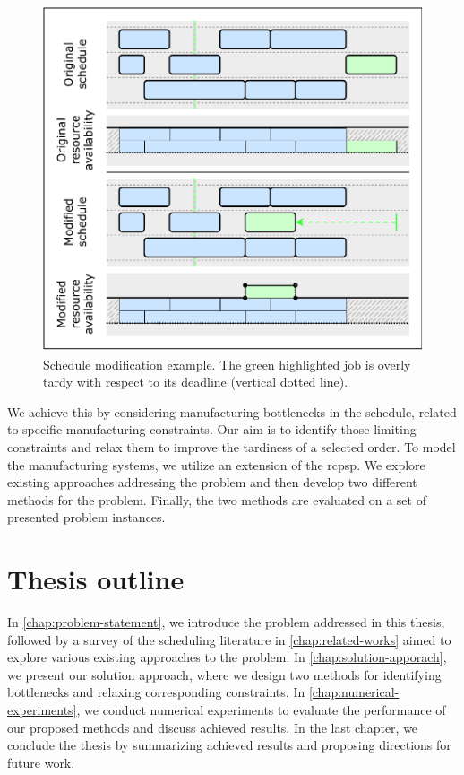 \begin{figure}[b]
    \centering
    \includegraphics[width=\textwidth]{img/Schedule-Change.pdf}
    \caption{
        Schedule modification example.
        The green highlighted job is overly tardy with respect to its deadline (vertical dotted line).
        }
    \label{fig:schedule-change}
\end{figure}

We achieve this by considering manufacturing bottlenecks in the schedule,
related to specific manufacturing constraints.
Our aim is to identify those limiting constraints
and relax them to improve the tardiness of a selected order.
To model the manufacturing systems, we utilize an extension of the \acf{rcpsp}.
We explore existing approaches addressing the problem
and then develop two different methods for the problem.
Finally, the two methods are evaluated on a set of presented problem instances.

\section*{Thesis outline} \label{sec:introduction/thesis-outline}

In \cref{chap:problem-statement}, we introduce the problem addressed in this thesis,
followed by a survey of the scheduling literature in \cref{chap:related-works}
aimed to explore various existing approaches to the problem.
In \cref{chap:solution-apporach}, we present our solution approach,
where we design two methods for identifying bottlenecks and relaxing corresponding constraints.
In \cref{chap:numerical-experiments}, we conduct numerical experiments to evaluate the performance
of our proposed methods and discuss achieved results.
In the last chapter, we conclude the thesis by summarizing achieved results
and proposing directions for future work.
